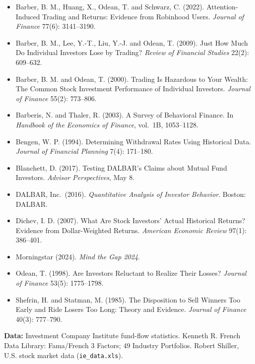 \begin{itemize}
  \item Barber, B. M., Huang, X., Odean, T. and Schwarz, C. (2022). Attention-Induced Trading and Returns: Evidence from Robinhood Users. \emph{Journal of Finance} 77(6): 3141--3190.
  \item Barber, B. M., Lee, Y.-T., Liu, Y.-J. and Odean, T. (2009). Just How Much Do Individual Investors Lose by Trading? \emph{Review of Financial Studies} 22(2): 609--632.
  \item Barber, B. M. and Odean, T. (2000). Trading Is Hazardous to Your Wealth: The Common Stock Investment Performance of Individual Investors. \emph{Journal of Finance} 55(2): 773--806.
  \item Barberis, N. and Thaler, R. (2003). A Survey of Behavioral Finance. In \emph{Handbook of the Economics of Finance}, vol.\ 1B, 1053--1128.
  \item Bengen, W. P. (1994). Determining Withdrawal Rates Using Historical Data. \emph{Journal of Financial Planning} 7(4): 171--180.
  \item Blanchett, D. (2017). Testing DALBAR's Claims about Mutual Fund Investors. \emph{Advisor Perspectives}, May 8.
  \item DALBAR, Inc.\ (2016). \emph{Quantitative Analysis of Investor Behavior}. Boston: DALBAR.
  \item Dichev, I. D. (2007). What Are Stock Investors' Actual Historical Returns? Evidence from Dollar-Weighted Returns. \emph{American Economic Review} 97(1): 386--401.
  \item Morningstar (2024). \emph{Mind the Gap 2024}.
  \item Odean, T. (1998). Are Investors Reluctant to Realize Their Losses? \emph{Journal of Finance} 53(5): 1775--1798.
  \item Shefrin, H. and Statman, M. (1985). The Disposition to Sell Winners Too Early and Ride Losers Too Long: Theory and Evidence. \emph{Journal of Finance} 40(3): 777--790.
\end{itemize}

\textbf{Data:} Investment Company Institute fund-flow statistics. Kenneth R. French Data Library: Fama/French 3 Factors; 49 Industry Portfolios. Robert Shiller, U.S. stock market data (\texttt{ie\_data.xls}).

